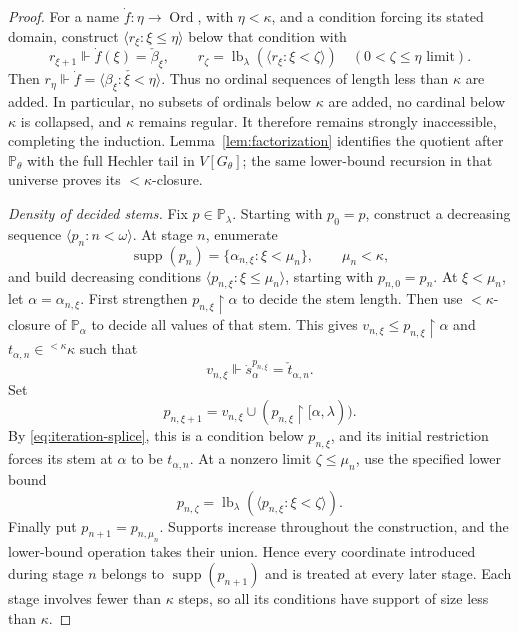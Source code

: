 \documentclass[11pt,a4paper]{amsart}
\theoremstyle{definition}
\theoremstyle{remark}
\newcommand{\PP}{\mathbb P}
\DeclareMathOperator{\supp}{supp}
\DeclareMathOperator{\Ord}{Ord}
\begin{document}
\begin{proof}
For a name \(\dot f:\eta\to\Ord\), with \(\eta<\kappa\),
and a condition forcing its stated domain, construct
\(\langle r_\xi:\xi\leq\eta\rangle\) below that condition
with
\[
 r_{\xi+1}\Vdash\dot f(\xi)=\check\beta_\xi,
 \qquad
 r_\zeta=\operatorname{lb}_\lambda
                   (\langle r_\xi:\xi<\zeta\rangle)
                  \quad(0<\zeta\leq\eta\text{ limit}).
\]
Then
\(r_\eta\Vdash\dot f=
\check{\langle\beta_\xi:\xi<\eta\rangle}\).
Thus no ordinal sequences of length less than \(\kappa\)
are added. In particular, no subsets of ordinals below
\(\kappa\) are added, no cardinal below \(\kappa\) is
collapsed, and \(\kappa\) remains regular. It therefore remains
strongly inaccessible, completing the induction.
Lemma~\ref{lem:factorization}
identifies the quotient after \(\PP_\theta\) with the full
Hechler tail in \(V[G_\theta]\); the same lower-bound
recursion in that universe proves its \(<\kappa\)-closure.

\emph{Density of decided stems.}
Fix \(p\in\PP_\lambda\). Starting with \(p_0=p\), construct
a decreasing sequence \(\langle p_n:n<\omega\rangle\).
At stage \(n\), enumerate
\[
 \supp(p_n)=\{\alpha_{n,\xi}:\xi<\mu_n\},
                         \qquad\mu_n<\kappa,
\]
and build decreasing conditions
\(\langle p_{n,\xi}:\xi\leq\mu_n\rangle\), starting with
\(p_{n,0}=p_n\). At \(\xi<\mu_n\), let
\(\alpha=\alpha_{n,\xi}\). First strengthen
\(p_{n,\xi}\restriction\alpha\) to decide the stem length.
Then use \(<\kappa\)-closure of \(\PP_\alpha\) to decide
all values of that stem. This gives
\(v_{n,\xi}\leq p_{n,\xi}\restriction\alpha\) and
\(t_{\alpha,n}\in{}^{<\kappa}\kappa\) such that
\[
 v_{n,\xi}\Vdash
                    \dot s_\alpha^{p_{n,\xi}}=\check t_{\alpha,n}.
\]
Set
\[
 p_{n,\xi+1}=v_{n,\xi}
                   \cup(p_{n,\xi}\restriction[\alpha,\lambda)).
\]
By \eqref{eq:iteration-splice}, this is a condition below
\(p_{n,\xi}\), and its initial restriction forces its stem
at \(\alpha\) to be \(t_{\alpha,n}\). At a nonzero limit
\(\zeta\leq\mu_n\), use the specified lower bound
\[
 p_{n,\zeta}=\operatorname{lb}_\lambda
                   (\langle p_{n,\xi}:\xi<\zeta\rangle).
\]
Finally put \(p_{n+1}=p_{n,\mu_n}\).
Supports increase throughout the construction, and the lower-bound
operation takes their union. Hence every coordinate introduced
during stage \(n\) belongs to \(\supp(p_{n+1})\) and is
treated at every later stage. Each stage involves fewer than
\(\kappa\) steps, so all its conditions have support of size less
than \(\kappa\).


\end{proof}
\end{document}

